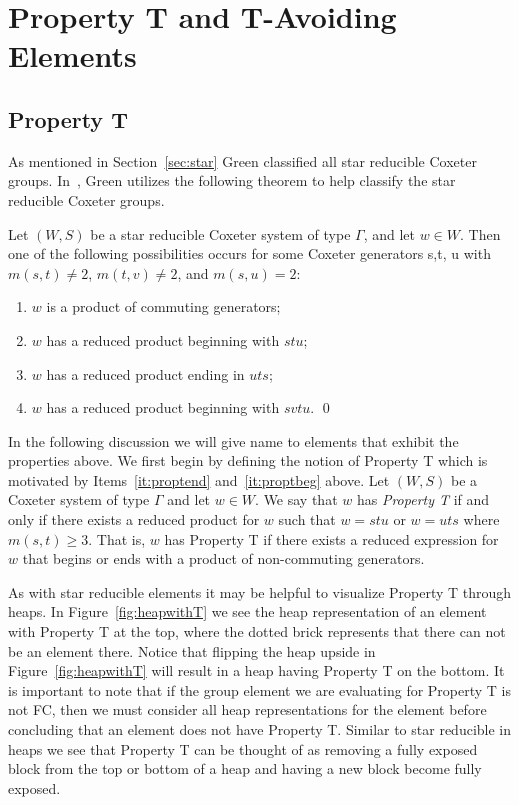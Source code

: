 \chapter{Property T and T-Avoiding Elements}\label{chap:TandTavoid}

\section{Property T}\label{Tavoid}

As mentioned in Section~\ref{sec:star} Green classified all star reducible Coxeter groups. In~\cite{Green2006a}, Green utilizes the following theorem to help classify the star reducible Coxeter groups. 
\begin{theorem}
	Let $(W,S)$ be a star reducible Coxeter system of type $\Gamma$, and let $w \in W$. Then one of the following possibilities occurs for some Coxeter generators s,t, u with $m(s,t) \neq 2$, $m(t,v) \neq 2$, and $m(s,u)=2$:
	\begin{enumerate}
	\item $w$ is a product of commuting generators;\label{it:triv}
	\item $w$ has a reduced product beginning with $stu$;\label{it:proptend}
	\item $w$ has a reduced product ending in $uts$;\label{it:proptbeg}
	\item $w$ has a reduced product beginning with $svtu$.\label{it:tavoid}	\qed
	\end{enumerate}
\end{theorem}

In the following discussion we will give name to elements that exhibit the properties above. We first begin by defining the notion of Property T which is motivated by Items~\ref{it:proptend} and~\ref{it:proptbeg} above. Let $(W,S)$ be a Coxeter system of type $\Gamma$ and let $w \in W$. We say that $w$ has \emph{Property T} if and only if there exists a reduced product for $w$ such that $w=stu$ or $w=uts$ where $m(s,t)\geq 3$. That is, $w$ has Property T if there exists a reduced expression for $w$ that begins or ends with a product of non-commuting generators.

As with star reducible elements it may be helpful to visualize Property T through heaps. In Figure~\ref{fig:heapwithT} we see the heap representation of an element with Property T at the top, where the dotted brick represents that there can not be an element there. Notice that flipping the heap upside  in Figure~\ref{fig:heapwithT} will result in a heap having Property T on the bottom. It is important to note that if the group element we are evaluating for Property T is not FC, then we must consider all heap representations for the element before concluding that an element does not have Property T. Similar to star reducible in heaps we see that Property T can be thought of as removing a fully exposed block from the top or bottom of a heap and having a new block become fully exposed. 

